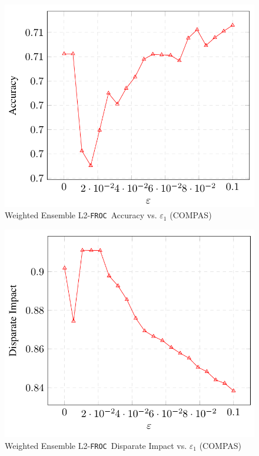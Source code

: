 \documentclass{article}
\newcommand{\ouralgo}{\texttt{FROC}}
\begin{document}
\begin{figure}[!h]
    \centering
    \includegraphics[width=1\linewidth]{Images/WEL2_COMPAS_Accuracy.png}
    \caption{Weighted Ensemble L2-\ouralgo\  Accuracy vs. $\varepsilon_1$ (COMPAS)}
    \label{fig:WEL2_COMPAS_Accuracy}
\end{figure}

\begin{figure}[!h]
    \centering
    \includegraphics[width=1\linewidth]{Images/WEL2_COMPAS_DI.png}
    \caption{Weighted Ensemble L2-\ouralgo\  Disparate Impact vs. $\varepsilon_1$ (COMPAS)}
    \label{fig:WEL2_COMPAS_DI}
\end{figure}
\end{document}

